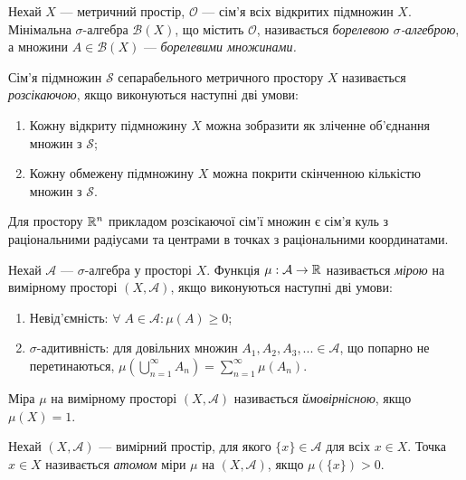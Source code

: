 \begin{definition}
    Нехай $X$ --- метричний простір, $\mathcal{O}$ ---
    сім'я всіх відкритих підмножин $X$. Мінімальна $\sigma$-алгебра
    $\mathcal{B}(X)$, що містить $\mathcal{O}$, називається
    \emph{борелевою $\sigma$-алгеброю}, а множини
    $A \in \mathcal{B}(X)$ --- \emph{борелевими множинами.}
\end{definition}
\begin{definition}
    Сім'я підмножин $\mathcal{S}$ сепарабельного метричного простору $X$ називається
    \emph{розсікаючою}, якщо виконуються наступні дві умови:
    \begin{enumerate}
        \item Кожну відкриту підмножину $X$ можна зобразити як зліченне об'єднання множин з $\mathcal{S}$;
        \item Кожну обмежену підмножину $X$ можна покрити скінченною кількістю множин з $\mathcal{S}$.
    \end{enumerate}
    Для простору $\mathbb{R}^n$ прикладом розсікаючої сім'ї множин є сім'я куль з
    раціональними радіусами та центрами в точках з раціональними координатами.
\end{definition}
\begin{definition}
    Нехай $\mathcal{A}$ --- $\sigma$-алгебра
    у просторі $X$. Функція $\mu: \mathcal{A} \to \mathbb{R}$ називається
    \emph{мірою} на вимірному просторі $\left(X, \mathcal{A}\right)$, якщо виконуються наступні дві умови:
    \begin{enumerate}
        \item Невід'ємність: $\forall \; A \in \mathcal{A} : \mu(A) \geq 0$;
        \item $\sigma$-адитивність: для довільних множин $A_1, A_2, A_3, ... \in \mathcal{A}$,
        що попарно не перетинаються, 
        $\mu\left(\bigcup_{n=1}^{\infty} A_n\right) = \sum_{n=1}^{\infty}\mu(A_n)$.
    \end{enumerate}
\end{definition}
\begin{definition}
    Міра $\mu$ на вимірному просторі $\left(X, \mathcal{A}\right)$ називається
    \emph{ймовірнісною}, якщо $\mu(X) = 1$.
\end{definition}
\begin{definition}
    Нехай $\left(X, \mathcal{A}\right)$ --- вимірний простір, для якого $\{ x \} \in \mathcal{A}$
    для всіх $x \in X$.
    Точка $x \in X$ називається \emph{атомом} міри $\mu$ на
    $\left(X, \mathcal{A}\right)$, якщо $\mu\left(\{x \}\right) > 0$.
\end{definition}
